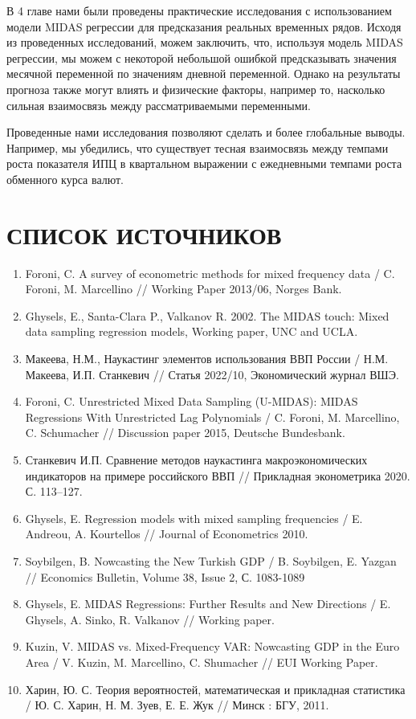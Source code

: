 \documentclass[a4paper, 14pt]{extarticle}
\begin{document}
	В 4 главе нами были проведены практические исследования с использованием модели MIDAS регрессии для предсказания реальных временных рядов. Исходя из проведенных исследований, можем заключить, что, используя модель MIDAS регрессии, мы можем с некоторой небольшой ошибкой предсказывать значения месячной переменной по значениям дневной переменной. Однако на результаты прогноза также могут влиять и физические факторы, например то, насколько сильная взаимосвязь между рассматриваемыми переменными.
	
	Проведенные нами исследования позволяют сделать и более глобальные выводы. Например, мы убедились, что существует тесная взаимосвязь между темпами роста показателя ИПЦ в квартальном выражении с ежедневными темпами роста обменного курса валют.
	\newpage
	\section{СПИСОК ИСТОЧНИКОВ}
	\begin{enumerate}
		\item Foroni, C. A survey of econometric methods for mixed frequency data / C. Foroni, M. Marcellino // Working Paper 2013/06, Norges Bank.
		\item Ghysels, E., Santa-Clara P., Valkanov R. 2002. The MIDAS touch: Mixed data sampling regression models, Working paper, UNC and UCLA.
		\item Макеева, Н.М., Наукастинг элементов использования ВВП России / Н.М. Макеева, И.П. Станкевич // Статья 2022/10, Экономический журнал ВШЭ.
		\item Foroni, C. Unrestricted Mixed Data Sampling (U-MIDAS): MIDAS Regressions With Unrestricted Lag Polynomials / C. Foroni, M. Marcellino, C. Schumacher // Discussion paper 2015, Deutsche Bundesbank.
		\item Станкевич И.П. Сравнение методов наукастинга макроэкономических индикаторов на примере российского ВВП // Прикладная эконометрика 2020. С. 113–127.
		\item Ghysels, E. Regression models with mixed sampling frequencies /  E. Andreou, A. Kourtellos // Journal of Econometrics 2010.
		\item Soybilgen, B. Nowcasting the New Turkish GDP / B. Soybilgen, E. Yazgan // Economics Bulletin, Volume 38, Issue 2, 
		С. 1083-1089
		\item Ghysels, E. MIDAS Regressions: Further Results and New Directions / E. Ghysels, A. Sinko, R. Valkanov // Working paper.
		\item Kuzin, V. MIDAS vs. Mixed-Frequency VAR:
		Nowcasting GDP in the Euro Area / V. Kuzin,
		M. Marcellino, C. Shumacher // EUI Working Paper.
		\item Харин, Ю. С. Теория вероятностей,
		математическая
		и прикладная статистика / Ю. С. Харин, Н. М. Зуев, Е. Е. Жук // Минск : БГУ, 2011. 
	\end{enumerate}
	\newpage
\end{document}
